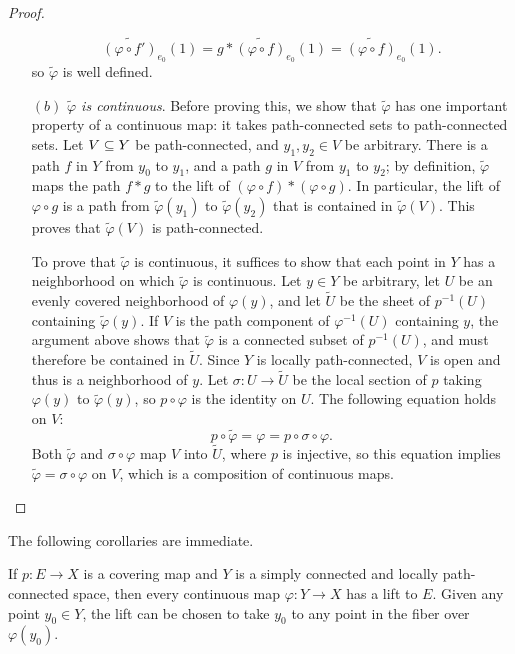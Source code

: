 \begin{proof}
\begin{itemize}
\[\widetilde{(\varphi\circ f')}_{e_0}(1)=g\ast\widetilde{(\varphi\circ f)}_{e_0}(1)=\widetilde{(\varphi\circ f)}_{e_0}(1).\]
so $\widetilde{\varphi}$ is well defined.
\item[$(b)$]\textit{$\widetilde{\varphi}$ is continuous}. Before proving this, we show that $\widetilde{\varphi}$ has one important property of a continuous map: it takes path-connected sets to path-connected sets. Let $V\subseteq Y$ be path-connected, and $y_1,y_2\in V$ be arbitrary. There is a path $f$ in $Y$ from $y_0$ to $y_1$, and a path $g$ in $V$ from $y_1$ to $y_2$; by definition, $\widetilde{\varphi}$ maps the
path $f\ast g$ to the lift of $(\varphi\circ f)\ast(\varphi\circ g)$. In particular, the lift of $\varphi\circ g$ is a path from $\widetilde{\varphi}(y_1)$ to $\widetilde{\varphi}(y_2)$ that is contained in $\widetilde{\varphi}(V)$. This proves that $\widetilde{\varphi}(V)$ is path-connected.\par
To prove that $\widetilde{\varphi}$ is continuous, it suffices to show that each point in $Y$ has a neighborhood on which $\widetilde{\varphi}$ is continuous. Let $y\in Y$ be arbitrary, let $U$ be an evenly covered neighborhood of $\varphi(y)$, and let $\widetilde{U}$ be the sheet of $p^{-1}(U)$ containing $\widetilde{\varphi}(y)$. If $V$ is the path component of $\varphi^{-1}(U)$ containing $y$, the argument above
shows that $\widetilde{\varphi}$ is a connected subset of $p^{-1}(U)$, and must therefore be contained in $\widetilde{U}$. Since $Y$ is locally path-connected, $V$ is open and thus is a neighborhood of $y$. Let $\sigma:U\to \widetilde{U}$ be the local section of $p$ taking $\varphi(y)$ to $\widetilde{\varphi}(y)$, so $p\circ\varphi$ is the identity on $U$. The following equation holds on $V$:
\[p\circ\widetilde{\varphi}=\varphi=p\circ\sigma\circ\varphi.\]
Both $\widetilde{\varphi}$ and $\sigma\circ\varphi$ map $V$ into $\widetilde{U}$, where $p$ is injective, so this equation implies $\widetilde{\varphi}=\sigma\circ\varphi$ on $V$, which is a composition of continuous maps.
\end{itemize}
\end{proof}
The following corollaries are immediate.
\begin{corollary}
If $p:E\to X$ is a covering map and $Y$ is a simply connected and locally path-connected space, then every continuous map $\varphi:Y\to X$ has a lift to $E$. Given any point $y_0\in Y$, the lift can be chosen to take $y_0$ to any point in the fiber over $\varphi(y_0)$.
\end{corollary}
